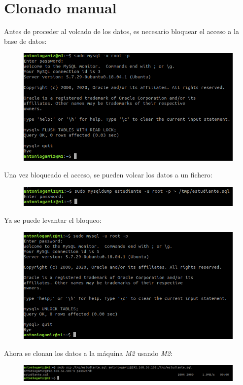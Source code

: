 \documentclass[12pt]{article}
\begin{document}
\section{Clonado manual}

Antes de proceder al volcado de los datos, es necesario bloquear el acceso a la base de datos:
\begin{figure}[H]
\center
\includegraphics[scale=0.35]{4.png}
\end{figure}
Una vez bloqueado el acceso, se pueden volcar los datos a un fichero:
\begin{figure}[H]
\center
\includegraphics[scale=0.35]{5.png}
\end{figure}
Ya se puede levantar el bloqueo:
\begin{figure}[H]
\center
\includegraphics[scale=0.35]{6.png}
\end{figure}
Ahora se clonan los datos a la máquina \textit{M2} usando \textit{M2}:
\begin{figure}[H]
\center
\includegraphics[scale=0.35]{7.png}
\end{figure}
\end{document}
